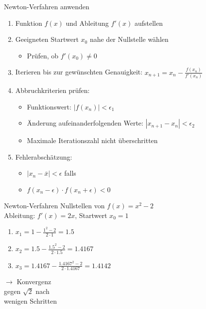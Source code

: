 \begin{KR}{Newton-Verfahren anwenden}
\begin{enumerate}
    \item Funktion $f(x)$ und Ableitung $f'(x)$ aufstellen
    \item Geeigneten Startwert $x_0$ nahe der Nullstelle wählen
    \begin{itemize}
        \item Prüfen, ob $f'(x_0) \neq 0$
    \end{itemize}
    \item Iterieren bis zur gewünschten Genauigkeit:
    $x_{n+1} = x_n - \frac{f(x_n)}{f'(x_n)}$
    \item Abbruchkriterien prüfen:
    \begin{itemize}
        \item Funktionswert: $|f(x_n)| < \epsilon_1$
        \item Änderung aufeinanderfolgenden Werte: $|x_{n+1}-x_n| < \epsilon_2$
        \item Maximale Iterationszahl nicht überschritten
    \end{itemize}
    \item Fehlerabschätzung:
    \begin{itemize}
        \item $|x_n-\bar{x}| < \epsilon$ falls
        \item $f(x_n-\epsilon) \cdot f(x_n+\epsilon) < 0$
    \end{itemize}
\end{enumerate}
\end{KR}

\begin{example2}{Newton-Verfahren} Nullstellen von $f(x)=x^2-2$\\
Ableitung: $f'(x) = 2x$, Startwert $x_0 = 1$
\vspace{1mm}\\
\begin{minipage}[t]{0.65\textwidth}
    \vspace{-3mm}
    \begin{enumerate}
        \item $x_1 = 1 - \frac{1^2-2}{2 \cdot 1} = 1.5$
        \item $x_2 = 1.5 - \frac{1.5^2-2}{2 \cdot 1.5} = 1.4167$
        \item $x_3 = 1.4167 - \frac{1.4167^2-2}{2 \cdot 1.4167} = 1.4142$
    \end{enumerate}
\end{minipage}
\begin{minipage}[t]{0.3\textwidth}
    $\rightarrow$ Konvergenz \\ gegen $\sqrt{2}$ nach \\ wenigen Schritten
\end{minipage}
\end{example2}






